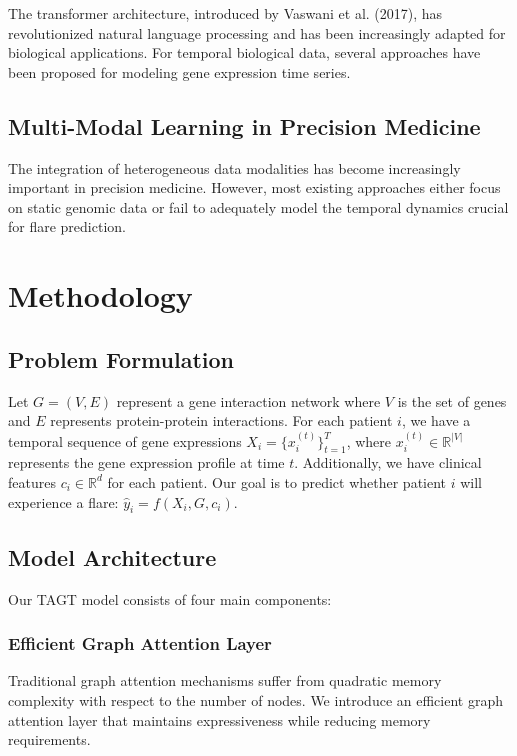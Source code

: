 \documentclass[10pt,twocolumn]{article}
\begin{document}
The transformer architecture, introduced by Vaswani et al. (2017), has revolutionized natural language processing and has been increasingly adapted for biological applications. For temporal biological data, several approaches have been proposed for modeling gene expression time series.

\subsection{Multi-Modal Learning in Precision Medicine}

The integration of heterogeneous data modalities has become increasingly important in precision medicine. However, most existing approaches either focus on static genomic data or fail to adequately model the temporal dynamics crucial for flare prediction.

\section{Methodology}

\subsection{Problem Formulation}

Let $G = (V, E)$ represent a gene interaction network where $V$ is the set of genes and $E$ represents protein-protein interactions. For each patient $i$, we have a temporal sequence of gene expressions $X_i = \{x_i^{(t)}\}_{t=1}^T$, where $x_i^{(t)} \in \mathbb{R}^{|V|}$ represents the gene expression profile at time $t$. Additionally, we have clinical features $c_i \in \mathbb{R}^d$ for each patient. Our goal is to predict whether patient $i$ will experience a flare: $\hat{y}_i = f(X_i, G, c_i)$.

\subsection{Model Architecture}

Our TAGT model consists of four main components:

\subsubsection{Efficient Graph Attention Layer}

Traditional graph attention mechanisms suffer from quadratic memory complexity with respect to the number of nodes. We introduce an efficient graph attention layer that maintains expressiveness while reducing memory requirements.
\end{document}

